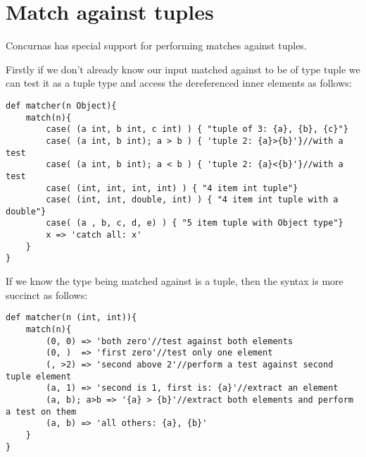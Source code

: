 \documentclass[conc-doc]{subfiles}
\begin{document}
\section{Match against tuples}
Concurnas has special support for performing matches against tuples.

Firstly if we don't already know our input matched against to be of type tuple we can test it as a tuple type and access the dereferenced inner elements as follows:
\begin{lstlisting}
def matcher(n Object){
	match(n){
		case( (a int, b int, c int) ) { "tuple of 3: {a}, {b}, {c}"}
		case( (a int, b int); a > b ) { 'tuple 2: {a}>{b}'}//with a test
		case( (a int, b int); a < b ) { 'tuple 2: {a}<{b}'}//with a test
		case( (int, int, int, int) ) { "4 item int tuple"}
		case( (int, int, double, int) ) { "4 item int tuple with a double"}
		case( (a , b, c, d, e) ) { "5 item tuple with Object type"}
		x => 'catch all: x'
	}
}
\end{lstlisting}

If we know the type being matched against is a tuple, then the syntax is more succinct as follows:
\begin{lstlisting}
def matcher(n (int, int)){
	match(n){
		(0, 0) => 'both zero'//test against both elements
		(0, )  => 'first zero'//test only one element
		(, >2) => 'second above 2'//perform a test against second tuple element
		(a, 1) => 'second is 1, first is: {a}'//extract an element
		(a, b); a>b => '{a} > {b}'//extract both elements and perform a test on them
		(a, b) => 'all others: {a}, {b}'
	}
}
\end{lstlisting}
\end{document}
